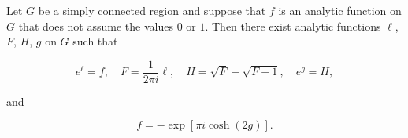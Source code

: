 Let $G$ be a simply connected region and suppose that $f$ is an analytic function on $G$ that does not assume the values $0$ or $1$. Then there exist analytic functions $\ell$, $F$, $H$, $g$ on $G$ such that

$$e^{\ell} = f, \quad F = \frac{1}{2\pi i} \ell, \quad H = \sqrt{F} - \sqrt{F-1}, \quad e^g = H,$$

and

$$f = -\exp[\pi i \cosh(2g)].$$

